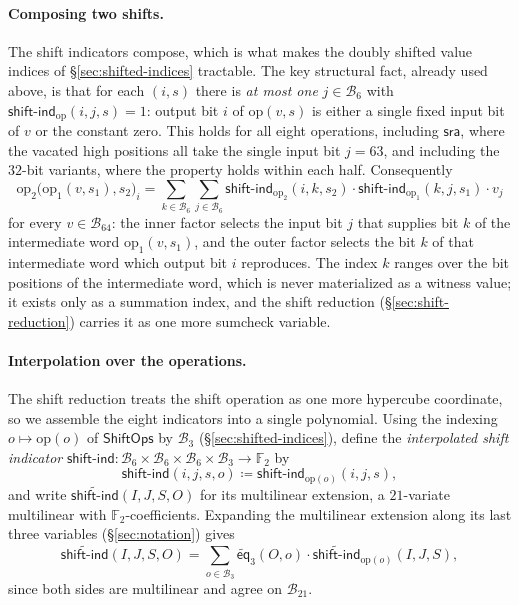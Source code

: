 \documentclass{article}
\theoremstyle{definition}
\newcommand*{\mle}{\widetilde}
\newcommand{\eq}{\mathsf{eq}}
\newcommand{\BB}{\mathcal{B}}
\newcommand{\FF}[1]{\mathbb{F}_{#1}}
\begin{document}
\paragraph{Composing two shifts.}
The shift indicators compose, which is what makes the doubly shifted value indices of \S\ref{sec:shifted-indices} tractable. The key structural fact, already used above, is that for each $(i, s)$ there is \emph{at most one} $j \in \BB_6$ with $\textsf{shift-ind}_\text{op}(i, j, s) = 1$: output bit $i$ of $\text{op}(v, s)$ is either a single fixed input bit of $v$ or the constant zero. This holds for all eight operations, including $\textsf{sra}$, where the vacated high positions all take the single input bit $j = 63$, and including the $32$-bit variants, where the property holds within each half. Consequently
\begin{equation}
  \text{op}_2\bigl( \text{op}_1(v, s_1), s_2 \bigr)_i = \sum_{k \in \BB_6} \sum_{j \in \BB_6} \textsf{shift-ind}_{\text{op}_2}(i, k, s_2) \cdot \textsf{shift-ind}_{\text{op}_1}(k, j, s_1) \cdot v_j
  \label{eq:composite-indicator}
\end{equation}
for every $v \in \BB_{64}$: the inner factor selects the input bit $j$ that supplies bit $k$ of the intermediate word $\text{op}_1(v, s_1)$, and the outer factor selects the bit $k$ of that intermediate word which output bit $i$ reproduces. The index $k$ ranges over the bit positions of the intermediate word, which is never materialized as a witness value; it exists only as a summation index, and the shift reduction (\S\ref{sec:shift-reduction}) carries it as one more sumcheck variable.

\paragraph{Interpolation over the operations.}
The shift reduction treats the shift operation as one more hypercube coordinate, so we assemble the eight indicators into a single polynomial. Using the indexing $o \mapsto \text{op}(o)$ of $\textsf{ShiftOps}$ by $\BB_3$ (\S\ref{sec:shifted-indices}), define the \emph{interpolated shift indicator} $\textsf{shift-ind} \colon \BB_6 \times \BB_6 \times \BB_6 \times \BB_3 \to \FF{2}$ by
\[
  \textsf{shift-ind}(i, j, s, o) \coloneqq \textsf{shift-ind}_{\text{op}(o)}(i, j, s),
\]
and write $\mle{\textsf{shift-ind}}(I, J, S, O)$ for its multilinear extension, a $21$-variate multilinear with $\FF{2}$-coefficients. Expanding the multilinear extension along its last three variables (\S\ref{sec:notation}) gives
\begin{equation}
  \mle{\textsf{shift-ind}}(I, J, S, O) = \sum_{o \in \BB_3} \mle{\eq}_3(O, o) \cdot \mle{\textsf{shift-ind}}_{\text{op}(o)}(I, J, S),
  \label{eq:shift-indicator-interpolation}
\end{equation}
since both sides are multilinear and agree on $\BB_{21}$.
\end{document}

